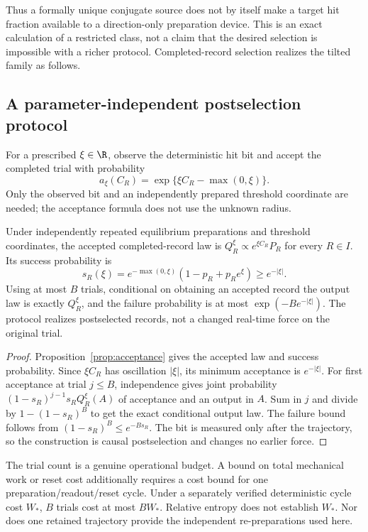 Thus a formally unique conjugate source does not by itself make a target hit fraction available to a direction-only preparation device. This is an exact calculation of a restricted class, not a claim that the desired selection is impossible with a richer protocol. Completed-record selection realizes the tilted family as follows.

\subsection{A parameter-independent postselection protocol}
For a prescribed $\xi\in\R$, observe the deterministic hit bit and accept the completed trial with probability
\[
 a_\xi(C_R)=\exp\{\xi C_R-\max(0,\xi)\}.
\]
Only the observed bit and an independently prepared threshold coordinate are needed; the acceptance formula does not use the unknown radius.

\begin{theorem}\label{thm:lorentz-selection}
Under independently repeated equilibrium preparations and threshold coordinates, the accepted completed-record law is $Q_R^\xi\propto e^{\xi C_R}P_R$ for every $R\in I$. Its success probability is
\[
 s_R(\xi)=e^{-\max(0,\xi)}(1-p_R+p_Re^\xi)\ge e^{-|\xi|}.
\]
Using at most $B$ trials, conditional on obtaining an accepted record the output law is exactly $Q_R^\xi$, and the failure probability is at most
$\exp(-Be^{-|\xi|})$. The protocol realizes postselected records, not a changed real-time force on the original trial.
\end{theorem}
\begin{proof}
Proposition~\ref{prop:acceptance} gives the accepted law and success probability. Since $\xi C_R$ has oscillation $|\xi|$, its minimum acceptance is $e^{-|\xi|}$. For first acceptance at trial $j\le B$, independence gives joint probability $(1-s_R)^{j-1}s_RQ_R^\xi(A)$ of acceptance and an output in $A$. Sum in $j$ and divide by $1-(1-s_R)^B$ to get the exact conditional output law. The failure bound follows from $(1-s_R)^B\le e^{-Bs_R}$. The bit is measured only after the trajectory, so the construction is causal postselection and changes no earlier force.
\end{proof}

The trial count is a genuine operational budget. A bound on total mechanical work or reset cost additionally requires a cost bound for one preparation/readout/reset cycle. Under a separately verified deterministic cycle cost $W_*$, $B$ trials cost at most $BW_*$. Relative entropy does not establish $W_*$. Nor does one retained trajectory provide the independent re-preparations used here.

